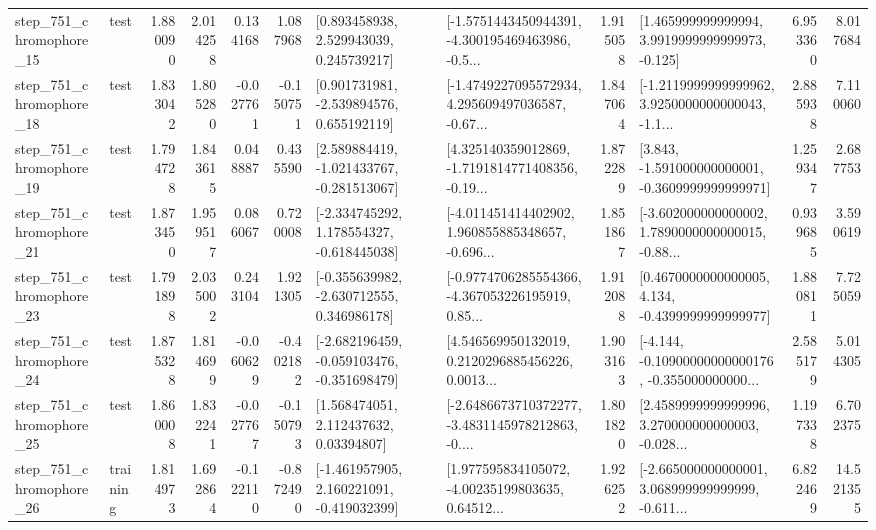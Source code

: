 \begin{tabular}{llrrrrllrlrr}
  step\_751\_chromophore\_15 &      test &      1.880090 &    2.014258 &      0.134168 &  1.087968 &     [0.893458938, 2.529943039, 0.245739217] &  [-1.5751443450944391, -4.300195469463986, -0.5... &       1.915058 &    [1.465999999999994, 3.9919999999999973, -0.125] &            6.953360 &          8.017684 \\
  step\_751\_chromophore\_18 &      test &      1.833042 &    1.805280 &     -0.027761 & -0.150751 &    [0.901731981, -2.539894576, 0.655192119] &  [-1.4749227095572934, 4.295609497036587, -0.67... &       1.847064 &  [-1.2119999999999962, 3.9250000000000043, -1.1... &            2.885938 &          7.110060 \\
  step\_751\_chromophore\_19 &      test &      1.794728 &    1.843615 &      0.048887 &  0.435590 &   [2.589884419, -1.021433767, -0.281513067] &  [4.325140359012869, -1.7191814771408356, -0.19... &       1.872289 &   [3.843, -1.591000000000001, -0.3609999999999971] &            1.259347 &          2.687753 \\
  step\_751\_chromophore\_21 &      test &      1.873450 &    1.959517 &      0.086067 &  0.720008 &   [-2.334745292, 1.178554327, -0.618445038] &  [-4.011451414402902, 1.960855885348657, -0.696... &       1.851867 &  [-3.602000000000002, 1.7890000000000015, -0.88... &            0.939685 &          3.590619 \\
  step\_751\_chromophore\_23 &      test &      1.791898 &    2.035002 &      0.243104 &  1.921305 &   [-0.355639982, -2.630712555, 0.346986178] &  [-0.9774706285554366, -4.367053226195919, 0.85... &       1.912088 &   [0.4670000000000005, 4.134, -0.4399999999999977] &            1.880811 &          7.725059 \\
  step\_751\_chromophore\_24 &      test &      1.875328 &    1.814699 &     -0.060629 & -0.402182 &  [-2.682196459, -0.059103476, -0.351698479] &  [4.546569950132019, 0.2120296885456226, 0.0013... &       1.903163 &  [-4.144, -0.10900000000000176, -0.355000000000... &            2.585179 &          5.014305 \\
  step\_751\_chromophore\_25 &      test &      1.860008 &    1.832241 &     -0.027767 & -0.150793 &      [1.568474051, 2.112437632, 0.03394807] &  [-2.6486673710372277, -3.4831145978212863, -0.... &       1.801820 &  [2.4589999999999996, 3.270000000000003, -0.028... &            1.197338 &          6.702375 \\
  step\_751\_chromophore\_26 &  training &      1.814973 &    1.692864 &     -0.122110 & -0.872490 &   [-1.461957905, 2.160221091, -0.419032399] &  [1.977595834105072, -4.00235199803635, 0.64512... &       1.926252 &  [-2.665000000000001, 3.068999999999999, -0.611... &            6.822469 &         14.521355 \\

\end{tabular}
